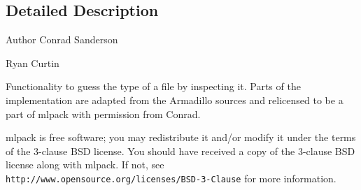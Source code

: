 \subsection{Detailed Description}
\begin{DoxyAuthor}{Author}
Conrad Sanderson 

Ryan Curtin
\end{DoxyAuthor}
Functionality to guess the type of a file by inspecting it. Parts of the implementation are adapted from the Armadillo sources and relicensed to be a part of mlpack with permission from Conrad.

mlpack is free software; you may redistribute it and/or modify it under the terms of the 3-\/clause B\+SD license. You should have received a copy of the 3-\/clause B\+SD license along with mlpack. If not, see {\tt http\+://www.\+opensource.\+org/licenses/\+B\+S\+D-\/3-\/\+Clause} for more information. 